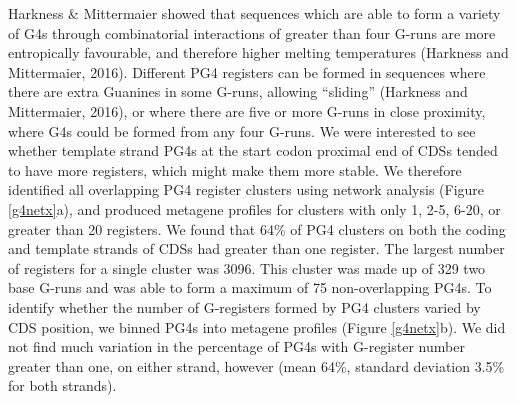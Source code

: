 \documentclass[12pt,a4paper,]{report}
\begin{document}
\newpage

Harkness \& Mittermaier showed that sequences which are able to form a
variety of G4s through combinatorial interactions of greater than four
G-runs are more entropically favourable, and therefore higher melting
temperatures (Harkness and Mittermaier, 2016). Different PG4 registers
can be formed in sequences where there are extra Guanines in some
G-runs, allowing ``sliding'' (Harkness and Mittermaier, 2016), or where
there are five or more G-runs in close proximity, where G4s could be
formed from any four G-runs. We were interested to see whether template
strand PG4s at the start codon proximal end of CDSs tended to have more
registers, which might make them more stable. We therefore identified
all overlapping PG4 register clusters using network analysis (Figure
\ref{g4netx}a), and produced metagene profiles for clusters with only 1,
2-5, 6-20, or greater than 20 registers. We found that 64\% of PG4
clusters on both the coding and template strands of CDSs had greater
than one register. The largest number of registers for a single cluster
was 3096. This cluster was made up of 329 two base G-runs and was able
to form a maximum of 75 non-overlapping PG4s. To identify whether the
number of G-registers formed by PG4 clusters varied by CDS position, we
binned PG4s into metagene profiles (Figure \ref{g4netx}b). We did not
find much variation in the percentage of PG4s with G-register number
greater than one, on either strand, however (mean 64\%, standard
deviation 3.5\% for both strands).

\newpage
\end{document}
